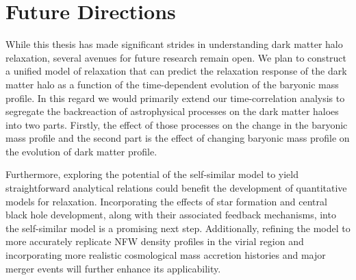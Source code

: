 \section*{Future Directions}
While this thesis has made significant strides in understanding dark matter halo relaxation, several avenues for future research remain open. We plan to construct a unified model of relaxation that can predict the relaxation response of the dark matter halo as a function of the time-dependent evolution of the baryonic mass profile. In this regard we would primarily extend our time-correlation analysis to segregate the backreaction of astrophysical processes on the dark matter haloes into two parts. Firstly, the effect of those processes on the change in the baryonic mass profile and the second part is the effect of changing baryonic mass profile on the evolution of dark matter profile.


Furthermore, exploring the potential of the self-similar model to yield straightforward analytical relations could benefit the development of quantitative models for relaxation. Incorporating the effects of star formation and central black hole development, along with their associated feedback mechanisms, into the self-similar model is a promising next step. Additionally, refining the model to more accurately replicate NFW density profiles in the virial region and incorporating more realistic cosmological mass accretion histories and major merger events will further enhance its applicability.
